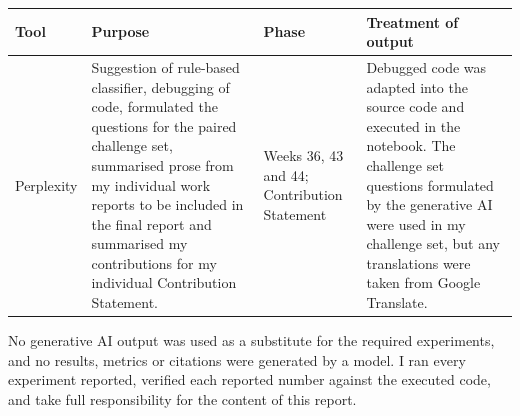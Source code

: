 \documentclass[11pt]{article}
\begin{document}
\begin{table}[!h]
    \centering
    \small
    \begin{tabular}{p{2.6cm}p{4.3cm}p{2.2cm}p{4.6cm}}
        \toprule
        Tool & Purpose & Phase & Treatment of output \\
        \midrule
        Perplexity
        & Suggestion of rule-based classifier, debugging of code, formulated the questions for the paired challenge set, summarised prose from my individual work reports to be included in the final report and summarised my contributions for my individual Contribution Statement.
        & Weeks 36, 43 and 44; Contribution Statement 
        & Debugged code was adapted into the source code and executed in the notebook. The challenge set questions formulated by the generative AI were used in my challenge set, but any translations were taken from Google Translate. \\
        \bottomrule
    \end{tabular}
\end{table}

\noindent
No generative AI output was used as a substitute for the required experiments, and no results, metrics or citations were generated by a model. I ran every experiment reported, verified each reported number against the executed code, and take full responsibility for the content of this report.



\end{document}
